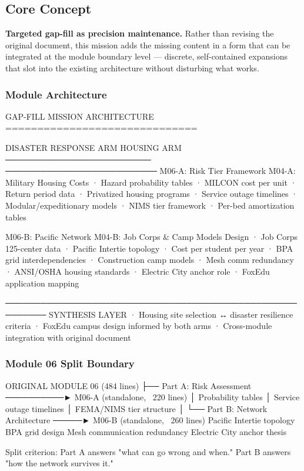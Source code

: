 \documentclass[11pt,letterpaper]{article}
\begin{document}
\subsection{Core Concept}

\textbf{Targeted gap-fill as precision maintenance.} Rather than revising the original document, this mission adds the missing content in a form that can be integrated at the module boundary level --- discrete, self-contained expansions that slot into the existing architecture without disturbing what works.

\subsubsection{Module Architecture}

\begin{asciibox}
GAP-FILL MISSION ARCHITECTURE
==============================

  DISASTER RESPONSE ARM          HOUSING ARM
  ─────────────────────────      ──────────────────────────
  M06-A: Risk Tier Framework     M04-A: Military Housing Costs
    · Hazard probability tables    · MILCON cost per unit
    · Return period data           · Privatized housing programs
    · Service outage timelines     · Modular/expeditionary models
    · NIMS tier framework          · Per-bed amortization tables

  M06-B: Pacific Network         M04-B: Job Corps & Camp Models
    Design                         · Job Corps 125-center data
    · Pacific Intertie topology    · Cost per student per year
    · BPA grid interdependencies   · Construction camp models
    · Mesh comm redundancy         · ANSI/OSHA housing standards
    · Electric City anchor role    · FoxEdu application mapping

  ─────────────────────────────────────────────────────────
  SYNTHESIS LAYER
    · Housing site selection ↔ disaster resilience criteria
    · FoxEdu campus design informed by both arms
    · Cross-module integration with original document
\end{asciibox}

\subsubsection{Module 06 Split Boundary}

\begin{asciibox}
ORIGINAL MODULE 06 (484 lines)
  ├── Part A: Risk Assessment ──────────► M06-A (standalone, ~220 lines)
  │     Probability tables
  │     Service outage timelines
  │     FEMA/NIMS tier structure
  │
  └── Part B: Network Architecture ─────► M06-B (standalone, ~260 lines)
        Pacific Intertie topology
        BPA grid design
        Mesh communication redundancy
        Electric City anchor thesis

Split criterion: Part A answers "what can go wrong and when."
                 Part B answers "how the network survives it."
\end{asciibox}
\end{document}
